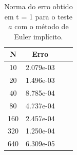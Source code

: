 \documentclass[a4paper, 12pt]{article}
\begin{document}
\begin{table}[!h]
    \centering
    \begin{tabular}{|c|c|c|c|}
    \hline                               %
    N & Erro \\
    \hline
    10  & 2.079e-03  \\
    20  & 1.496e-03  \\
    40  & 8.785e-04  \\
    80  & 4.737e-04  \\
    160 & 2.457e-04  \\
    320 & 1.250e-04  \\
    640 & 6.309e-05  \\
    \hline
    \end{tabular}
    \caption{Norma do erro obtido em t = 1 para o teste $a$ com o método de Euler implícito.}
\end{table}
\end{document}
